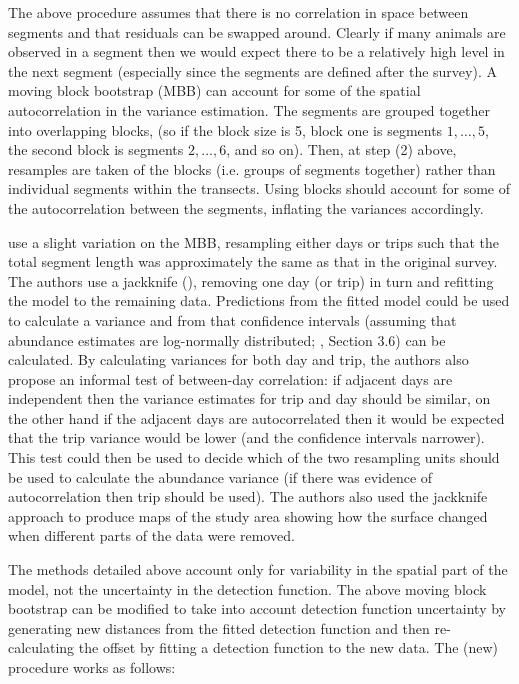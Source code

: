 \documentclass[a4paper,12pt]{article}
\begin{document}
The above procedure assumes that there is no correlation in space between segments and that residuals can be swapped around. Clearly if many animals are observed in a segment then we would expect there to be a relatively high level in the next segment (especially since the segments are defined after the survey). A moving block bootstrap (MBB) can account for some of the spatial autocorrelation in the variance estimation. The segments are grouped together into overlapping blocks, (so if the block size is 5, block one is segments $1,\ldots,5$, the second block is segments $2,\ldots,6$, and so on). Then, at step (2) above, resamples are taken of the blocks (i.e. groups of segments together) rather than individual segments within the transects. Using blocks should account for some of the autocorrelation between the segments, inflating the variances accordingly.

\cite{Williams:2006tz} use a slight variation on the MBB, resampling either days or trips such that the total segment length was approximately the same as that in the original survey. The authors use a jackknife (\cite{Efron:1979ha}), removing one day (or trip) in turn and refitting the model to the remaining data. Predictions from the fitted model could be used to calculate a variance and from that confidence intervals (assuming that abundance estimates are log-normally distributed; \cite{Buckland:2001vm}, Section 3.6) can be calculated. By calculating variances for both day and trip, the authors also propose an informal test of between-day correlation: if adjacent days are independent then the variance estimates for trip and day should be similar, on the other hand if the adjacent days are autocorrelated then it would be expected that the trip variance would be lower (and the confidence intervals narrower). This test could then be used to decide which of the two resampling units should be used to calculate the abundance variance (if there was evidence of autocorrelation then trip should be used). The authors also used the jackknife approach to produce maps of the study area showing how the surface changed when different parts of the data were removed.

The methods detailed above account only for variability in the spatial part of the model, not the uncertainty in the detection function. The above moving block bootstrap can be modified to take into account detection function uncertainty by generating new distances from the fitted detection function and then re-calculating the offset by fitting a detection function to the new data. The (new) procedure works as follows:
\end{document}
